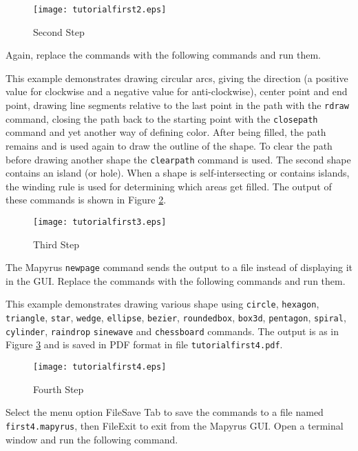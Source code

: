 \begin{figure}[htb]
\texttt{[image: tutorialfirst2.eps]}
\caption{Second Step}
\label{tutorialfirst2}
\end{figure}

Again, replace the commands with the following commands and run them.



This example demonstrates drawing circular arcs,
giving the direction (a positive value for clockwise and a negative
value for anti-clockwise), center point and end point,
drawing line segments relative to the last point in the path
with the \texttt{rdraw} command,
closing the path back to the starting point
with the \texttt{closepath} command and
yet another way of defining color.
After being filled, the path remains and is used again to draw the outline
of the shape.
To clear the path before drawing another shape the
\texttt{clearpath}
command is used.
The second shape contains an island (or hole).  When a shape is
self-intersecting or contains islands, the winding rule is
used for determining which areas get filled.
The output of these commands is shown in Figure \ref{tutorialfirst3}.

\begin{figure}[htb]
\texttt{[image: tutorialfirst3.eps]}
\caption{Third Step}
\label{tutorialfirst3}
\end{figure}

The Mapyrus \texttt{newpage} command sends the output to a file instead
of displaying it in the GUI.
Replace the commands with the following commands and run them.



This example demonstrates drawing various shape using
\texttt{circle},
\texttt{hexagon}, \texttt{triangle}, \texttt{star},
\texttt{wedge}, \texttt{ellipse}, \texttt{bezier},
\texttt{roundedbox}, \texttt{box3d},
\texttt{pentagon}, \texttt{spiral},
\texttt{cylinder}, \texttt{raindrop}
\texttt{sinewave} and \texttt{chessboard}
commands.
The output is as in Figure \ref{tutorialfirst4} and is
saved in PDF format in file \texttt{tutorialfirst4.pdf}.

\begin{figure}[htb]
\texttt{[image: tutorialfirst4.eps]}
\caption{Fourth Step}
\label{tutorialfirst4}
\end{figure}

Select the menu option File\textrightarrow{}Save Tab to save the commands
to a file named \texttt{first4.mapyrus}, then
File\textrightarrow{}Exit to exit from the Mapyrus GUI.
Open a terminal window and run the following command.

